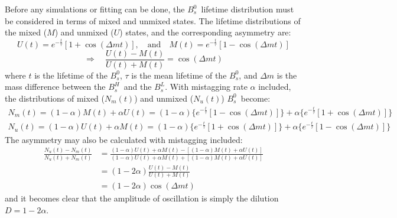 \documentclass[10pt]{article}
\newcommand{\Bs}{\mbox{$B_{s}^{0}$}}
\newcommand{\Bsl}{\mbox{$B_{s}^{L}$}}
\newcommand{\Bsh}{\mbox{$B_{s}^{H}$}}
\begin{document}
Before any simulations or fitting can be done, the \Bs\ lifetime distribution must be considered in terms of mixed and unmixed states. The lifetime distributions of the mixed ($M$) and unmixed ($U$) states, and the corresponding asymmetry are:
\begin{displaymath}
    U(t) = e^{-\frac{t}{\tau}}[ 1 + \cos (\Delta m t) ],
    \quad \mbox{and} \quad
    M(t) = e^{-\frac{t}{\tau}}[ 1 - \cos (\Delta m t) ]
\end{displaymath}
\begin{displaymath}
    \Rightarrow \quad
    \frac{U(t)-M(t)}{U(t)+M(t)} = \cos(\Delta m t)
\end{displaymath}
where $t$ is the lifetime of the \Bs , $\tau$ is the mean lifetime
of the \Bs , and $\Delta m$  is the mass difference between the
\Bsh\ and the \Bsl .  With mistagging rate $\alpha$ included, the
distributions of mixed ($N_{m}(t)$) and unmixed ($N_{u}(t)$) \Bs\
become:
\begin{eqnarray*}
    N_{m}(t) = (1-\alpha)M(t) + \alpha U(t)
    = (1-\alpha)\{e^{-\frac{t}{\tau}}[1-\cos(\Delta m t)]\}
    + \alpha\{e^{-\frac{t}{\tau}}[1+\cos(\Delta m t)]\}
    \\
    N_{u}(t) = (1-\alpha)U(t) + \alpha M(t)
    = (1-\alpha)\{e^{-\frac{t}{\tau}}[1+\cos(\Delta m t)]\}
    + \alpha\{e^{-\frac{t}{\tau}}[1-\cos(\Delta m t)]\}
\end{eqnarray*}
The asymmetry may also be calculated with mistagging included:
\begin{align*}
    \frac{N_{u}(t) - N_{m}(t)}{N_{u}(t) + N_{m}(t)} &= \frac{(1-\alpha)U(t) + \alpha M(t) -\left[(1-\alpha)M(t) + \alpha U(t)\right]}{(1-\alpha)U(t) + \alpha M(t) +\left[(1-\alpha)M(t) + \alpha U(t)\right]}\\
    &= (1-2\alpha)\frac{U(t)-M(t)}{U(t)+M(t)}\\
    &= (1-2\alpha)\cos(\Delta m t)
\end{align*}
and it becomes clear that the amplitude of oscillation is simply the dilution $D = 1-2\alpha$.\\
\end{document}
